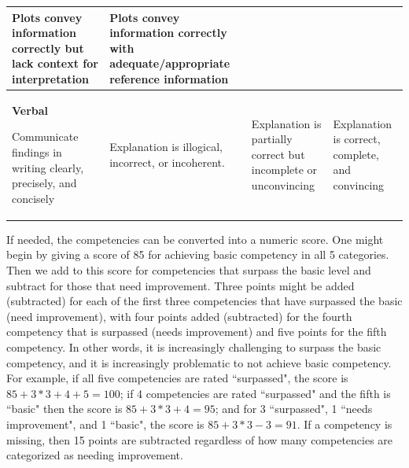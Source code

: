 \begin{tabular}{| p{4cm} | p{4cm} | p{4cm} | p{4cm} |}
Plots convey information correctly but lack context for interpretation &


Plots convey information correctly with adequate/appropriate reference information \\


\hline


\textbf{Verbal}


Communicate findings in writing clearly, precisely, and concisely &


Explanation is illogical, incorrect, or incoherent. &


Explanation is partially correct but incomplete or unconvincing &


Explanation is correct, complete, and convincing \\


\hline


\end{tabular}





If needed, the competencies can be converted into a numeric score. 
One might begin by giving a score of 85 for achieving basic competency in all 5 categories.
Then we add to this score for competencies that surpass the basic level and subtract for 
those that need improvement.
Three points might be added (subtracted) for each of the first three competencies that 
have surpassed the basic (need improvement), with
four points added (subtracted) for the fourth competency that is surpassed (needs improvement) 
and five points for the fifth competency. 
In other words, it is increasingly challenging to surpass the basic competency, 
and it is increasingly problematic to not achieve basic competency.
For example, if all five competencies
are rated ``surpassed", the score is $85 + 3*3 +4 + 5 = 100$; 
if 4 competencies are rated ``surpassed" and the fifth is ``basic" then the score is $85 + 3*3 +4 = 95$; and for 3 ``surpassed", 1 
``needs improvement", and 1 ``basic", the score is $85 + 3*3 - 3 = 91$.
If a competency is missing, then 15 points are subtracted regardless of how many 
competencies are categorized as needing improvement.



